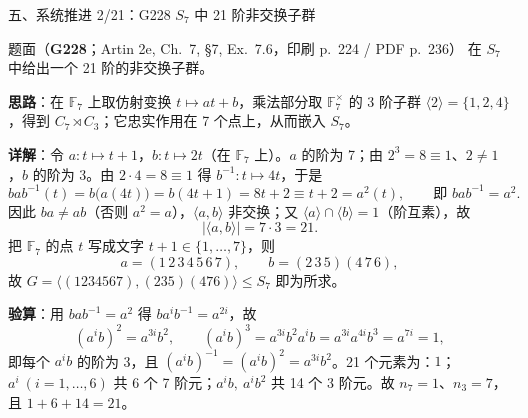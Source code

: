 \documentclass[aspectratio=169,10pt,fontset=none]{ctexbeamer}
\newcommand{\ex}[1]{\textcolor{accent}{\footnotesize\bfseries #1}}
\newcommand{\key}[1]{\textcolor{ink}{\bfseries #1}}
\begin{document}
\begin{frame}[t]{五、系统推进 2/21：G228 $S_7$ 中 21 阶非交换子群}
\label{ex:G228}
\scriptsize
\begin{block}{\footnotesize 题面（\ex{G228}；Artin 2e, Ch.~7, §7, Ex.~7.6，印刷 p.~224 / PDF p.~236）}
在 $S_7$ 中给出一个 21 阶的非交换子群。
\end{block}
\key{思路}：在 $\mathbb F_7$ 上取仿射变换 $t\mapsto at+b$，乘法部分取 $\mathbb F_7^\times$ 的 3 阶子群 $\langle2\rangle=\{1,2,4\}$，得到 $C_7\rtimes C_3$；它忠实作用在 7 个点上，从而嵌入 $S_7$。

\key{详解}：令 $a:t\mapsto t+1$，$b:t\mapsto2t$（在 $\mathbb F_7$ 上）。$a$ 的阶为 7；由 $2^3=8\equiv1$、$2\ne1$，$b$ 的阶为 3。由 $2\cdot4=8\equiv1$ 得 $b^{-1}:t\mapsto4t$，于是
\[ bab^{-1}(t)=b\bigl(a(4t)\bigr)=b(4t+1)=8t+2\equiv t+2=a^2(t),\qquad\text{即 }bab^{-1}=a^2. \]
因此 $ba\ne ab$（否则 $a^2=a$），$\langle a,b\rangle$ 非交换；又 $\langle a\rangle\cap\langle b\rangle=1$（阶互素），故
\[ |\langle a,b\rangle|=7\cdot3=21. \]
把 $\mathbb F_7$ 的点 $t$ 写成文字 $t+1\in\{1,\dots,7\}$，则
\[ a=(1\,2\,3\,4\,5\,6\,7),\qquad b=(2\,3\,5)(4\,7\,6), \]
故 $G=\langle(1234567),(235)(476)\rangle\le S_7$ 即为所求。

\key{验算}：用 $bab^{-1}=a^2$ 得 $ba^ib^{-1}=a^{2i}$，故
\[ (a^ib)^2=a^{3i}b^2,\qquad (a^ib)^3=a^{3i}b^2a^ib=a^{3i}a^{4i}b^3=a^{7i}=1, \]
即每个 $a^ib$ 的阶为 3，且 $(a^ib)^{-1}=(a^ib)^2=a^{3i}b^2$。21 个元素为：$1$；$a^i\ (i=1,\dots,6)$ 共 6 个 7 阶元；$a^ib,\ a^ib^2$ 共 14 个 3 阶元。故 $n_7=1$、$n_3=7$，且 $1+6+14=21$。
\end{frame}
\end{document}
